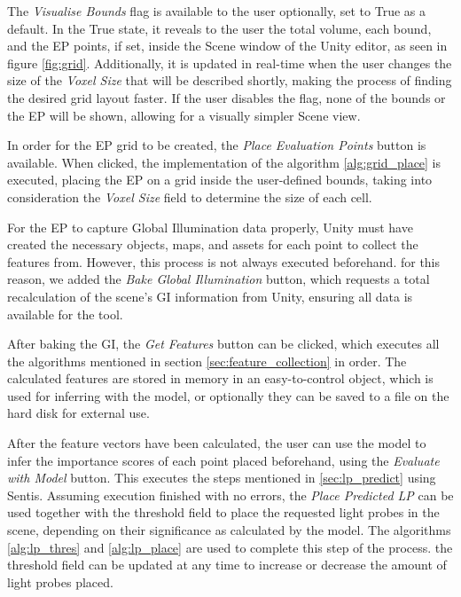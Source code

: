 The \textit{Visualise Bounds} flag is available to the user optionally, set to True as a default. In the True state, it reveals to the user the total volume, each bound, and the EP points, if set, inside the Scene window of the Unity editor, as seen in figure \ref{fig:grid}. Additionally, it is updated in real-time when the user changes the size of the \textit{Voxel Size} that will be described shortly, making the process of finding the desired grid layout faster. If the user disables the flag, none of the bounds or the EP will be shown, allowing for a visually simpler Scene view.

In order for the EP grid to be created, the \textit{Place Evaluation Points} button is available. When clicked, the implementation of the algorithm \ref{alg:grid_place} is executed, placing the EP on a grid inside the user-defined bounds, taking into consideration the \textit{Voxel Size} field to determine the size of each cell.

For the EP to capture Global Illumination data properly, Unity must have created the necessary objects, maps, and assets for each point to collect the features from. However, this process is not always executed beforehand. for this reason, we added the \textit{Bake Global Illumination} button, which requests a total recalculation of the scene's GI information from Unity, ensuring all data is available for the tool.

After baking the GI, the \textit{Get Features} button can be clicked, which executes all the algorithms mentioned in section \ref{sec:feature_collection} in order. The calculated features are stored in memory in an easy-to-control object, which is used for inferring with the model, or optionally they can be saved to a file on the hard disk for external use.

After the feature vectors have been calculated, the user can use the model to infer the importance scores of each point placed beforehand, using the \textit{Evaluate with Model} button. This executes the steps mentioned in \ref{sec:lp_predict} using Sentis. Assuming execution finished with no errors, the \textit{Place Predicted LP} can be used together with the threshold field to place the requested light probes in the scene, depending on their significance as calculated by the model. The algorithms \ref{alg:lp_thres} and \ref{alg:lp_place} are used to complete this step of the process. the threshold field can be updated at any time to increase or decrease the amount of light probes placed.

